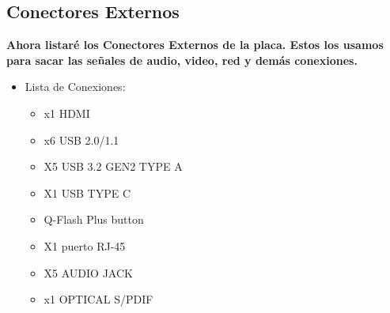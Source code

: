 \documentclass{article}
\begin{document}
    \subsection{Conectores Externos}
      \normalsize
        {\bfseries Ahora listaré los Conectores Externos de la placa. Estos los usamos para sacar las señales de audio, video, red y demás conexiones.}
        \begin{itemize}
          \item Lista de Conexiones:

          \begin{minipage}{0.5\textwidth}
            \begin{itemize}%
              \item x1 HDMI
              \item x6 USB 2.0/1.1
              \item X5 USB 3.2 GEN2 TYPE A
              \item X1 USB TYPE C
              \item Q-Flash Plus button
              \item X1 puerto RJ-45
              \item X5 AUDIO JACK 
              \item x1 OPTICAL S/PDIF 
            \end{itemize}
          \end{minipage}
          \begin{minipage}{\textwidth}

\end{minipage}
\end{itemize}
\end{document}
